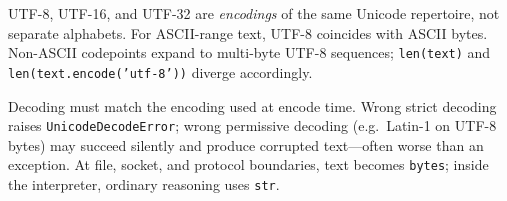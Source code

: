 UTF-8, UTF-16, and UTF-32 are \emph{encodings} of the same Unicode repertoire, not separate alphabets. For ASCII-range text, UTF-8 coincides with ASCII bytes. Non-ASCII codepoints expand to multi-byte UTF-8 sequences; \texttt{len(text)} and \texttt{len(text.encode('utf-8'))} diverge accordingly.

Decoding must match the encoding used at encode time. Wrong strict decoding raises \texttt{UnicodeDecodeError}; wrong permissive decoding (e.g.\ Latin-1 on UTF-8 bytes) may succeed silently and produce corrupted text---often worse than an exception. At file, socket, and protocol boundaries, text becomes \texttt{bytes}; inside the interpreter, ordinary reasoning uses \texttt{str}.

